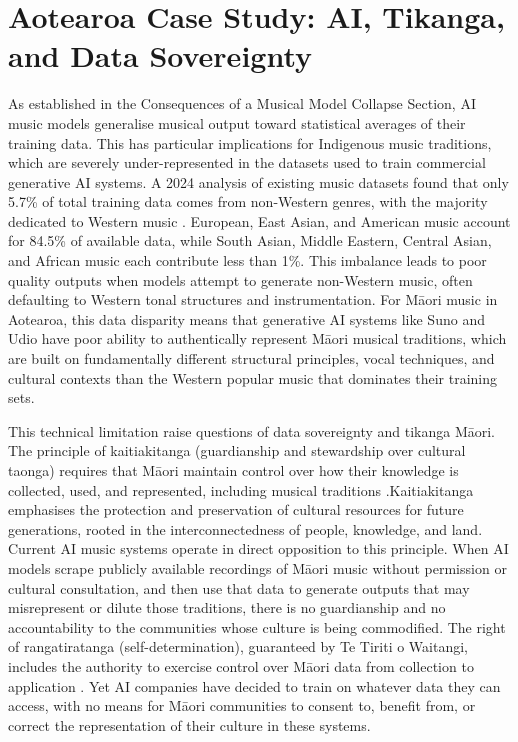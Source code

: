 \documentclass{article}
\begin{document}
\section{Aotearoa Case Study: AI, Tikanga, and Data Sovereignty}

As established in the Consequences of a Musical Model Collapse Section, AI music models generalise musical output toward statistical averages of their training data. This has particular implications for Indigenous music traditions, which are severely under-represented in the datasets used to train commercial generative AI systems. A 2024 analysis of existing music datasets found that only 5.7\% of total training data comes from non-Western genres, with the majority dedicated to Western music \cite{mehta2025music}. European, East Asian, and American music account for 84.5\% of available data, while South Asian, Middle Eastern, Central Asian, and African music each contribute less than 1\%. This imbalance leads to poor quality outputs when models attempt to generate non-Western music, often defaulting to Western tonal structures and instrumentation. For Māori music in Aotearoa, this data disparity means that generative AI systems like Suno and Udio have poor ability to authentically represent Māori musical traditions, which are built on fundamentally different structural principles, vocal techniques, and cultural contexts than the Western popular music that dominates their training sets.

This technical limitation raise questions of data sovereignty and tikanga Māori. The principle of kaitiakitanga (guardianship and stewardship over cultural taonga) requires that Māori maintain control over how their knowledge is collected, used, and represented, including musical traditions \cite{lilley2024maori}.Kaitiakitanga emphasises the protection and preservation of cultural resources for future generations, rooted in the interconnectedness of people, knowledge, and land. Current AI music systems operate in direct opposition to this principle. When AI models scrape publicly available recordings of Māori music without permission or cultural consultation, and then use that data to generate outputs that may misrepresent or dilute those traditions, there is no guardianship and no accountability to the communities whose culture is being commodified. The right of rangatiratanga (self-determination), guaranteed by Te Tiriti o Waitangi, includes the authority to exercise control over Māori data from collection to application \cite{lilley2024maori}. Yet AI companies have decided to train on whatever data they can access, with no means for Māori communities to consent to, benefit from, or correct the representation of their culture in these systems.
\end{document}

